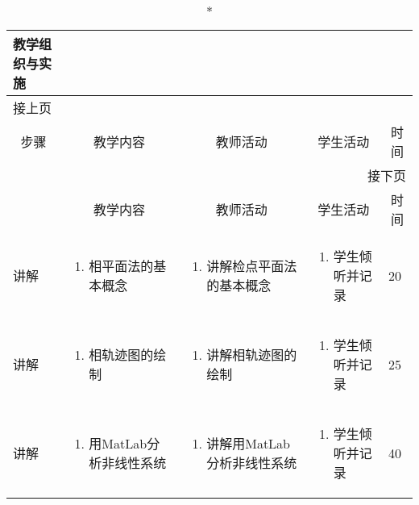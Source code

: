 {%
\begin{landscape}

\begin{longtable}{|m{10mm}|m{50mm}|m{50mm}|m{50mm}|m{15mm}|}
\caption*{\huge 教学组织与实施}\\
\hline
\endfirsthead
\multicolumn{5}{l}{\small 接上页}\\
\hline
\multicolumn{1}{|c|}{步骤}&\multicolumn{1}{c|}{教学内容}&\multicolumn{1}{c|}{教师活动}&\multicolumn{1}{c|}{学生活动}&\multicolumn{1}{c|}{时间}\\
\hline
\endhead

\multicolumn{5}{r}{\small 接下页}\\
\endfoot
\hline
\endlastfoot
\multicolumn{1}{|c|}{步骤}&\multicolumn{1}{c|}{教学内容}&\multicolumn{1}{c|}{教师活动}&\multicolumn{1}{c|}{学生活动}&\multicolumn{1}{c|}{时间}\\\hline
讲解&\begin{enumerate}
\item 相平面法的基本概念
\end{enumerate} &\begin{enumerate}
\item 讲解检点平面法的基本概念
\end{enumerate} &\begin{enumerate}
\item 学生倾听并记录
\end{enumerate} &20\\\hline
讲解&\begin{enumerate}
\item 相轨迹图的绘制
\end{enumerate}
 &\begin{enumerate}
\item 讲解相轨迹图的绘制
\end{enumerate} &\begin{enumerate}
\item 学生倾听并记录
\end{enumerate} &25 \\\hline
讲解&\begin{enumerate}
\item 用MatLab分析非线性系统
\end{enumerate}
&\begin{enumerate}
\item 讲解用MatLab分析非线性系统
\end{enumerate} &\begin{enumerate}
\item 学生倾听并记录
\end{enumerate} &40 \\\hline


\end{longtable}
\end{landscape}}
